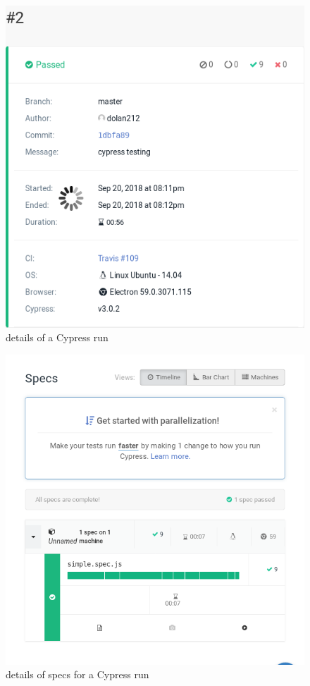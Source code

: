 \documentclass[12pt]{article}
\begin{document}
    \begin{figure}[h]
        \centering
        \includegraphics[width=\textwidth]{cypress_run_1}
        \caption{details of a Cypress run}
    \end{figure}
    \begin{figure}[h]
        \centering
        \includegraphics[width=\textwidth]{cypress_run_2}
        \caption{details of specs for a Cypress run}
    \end{figure}
    
    
\end{document}
